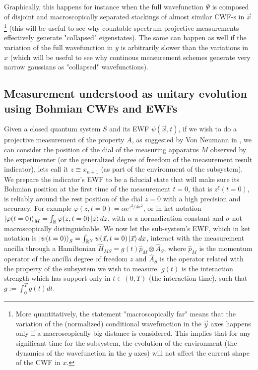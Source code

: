 \documentclass[11pt, a4paper]{article} %
\newcommand{\R}{\mathbb{R}} %
\begin{document}
Graphically, this happens for instance when the full wavefunction $\Psi$ is composed of disjoint and macroscopically separated stackings of almost similar CWF-s in $\vec{x}$ \footnote{More quantitatively, the statement "macroscopically far" means that the variation of the (normalized) conditional wavefunction in the $\vec{y}$ axes happens only if a macroscopically big distance is considered. This implies that for any significant time for the subsystem, the evolution of the environment (the dynamics of the wavefunction in the $y$ axes) will not affect the current shape of the CWF in $x$.} (this will be useful to see why countable spectrum projective measurements effectively generate "collapsed" eigenstates). The same can happen as well if the variation of the full wavefunction in $y$ is arbitrarily slower than the variations in $x$ (which will be useful to see why continous measurement schemes generate very narrow gaussians as "collapsed" wavefunctions).

\subsection*{Measurement understood as unitary evolution using Bohmian CWFs and EWFs}

Given a closed quantum system $S$ and its EWF $\psi(\vec{x},t)$, if we wish to do a projective measurement of the property $A$, as suggested by Von Neumann in \cite{VonNeumann}, we can consider the position of the dial of the measuring apparatus $M$ observed by the experimenter (or the generalized degree of freedom of the measurement result indicator), lets call it $z\equiv x_{n+1}$ (as part of the environment of the subsystem). We prepare the indicator's EWF to be a fiducial state that will make sure its Bohmian position at the first time of the measurement $t=0$, that is $z^\xi(t=0)$, is reliably around the rest position of the dial $z=0$ with a high precision and accuracy. For example $\varphi(z,t=0)=\alpha e^{z^2/4\sigma^2}$, or in ket notation $\ket{\varphi(t=0)}_M=\int_\R\varphi(z,t=0) \ket{z}dz$,  with $\alpha$ a normalization constant and $\sigma$ not macroscopically distinguishable. We now let the sub-system's EWF, which in ket notation is $\ket{\psi(t=0)}_S=\int_{\R^N}\psi(\vec{x},t=0)\ket{\vec{x}}dx$, interact with the measurement ancilla through a Hamiltonian $\hat{H}_{MS}=g(t)\hat{p}_M\otimes \hat{A}_S$, where $\hat{p}_M$ is the momentum operator of the ancilla degree of freedom $z$ and $\hat{A}_S$ is the operator related with the property of the subsystem we wish to measure. $g(t)$ is the interaction strength which has support only in $t\in(0,T)$ (the interaction time), such that $g:=\int_0^Tg(t)dt$. 
\end{document}
